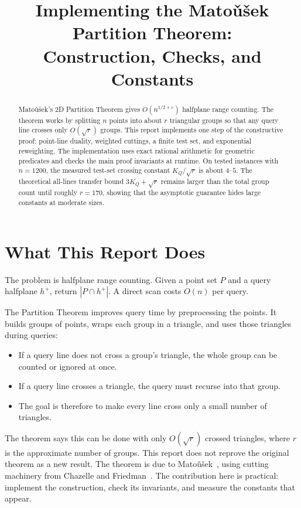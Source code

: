 \documentclass[11pt,a4paper]{article}
\title{Implementing the Mato\v{u}\v{s}ek Partition Theorem:\\
       Construction, Checks, and Constants}
\author{}
\date{}
\begin{document}
\maketitle

\begin{abstract}
Mato\v{u}\v{s}ek's 2D Partition Theorem gives
$O(n^{1/2+\varepsilon})$ halfplane range counting. The theorem works
by splitting $n$ points into about $r$ triangular groups so that any
query line crosses only $O(\sqrt r)$ groups. This report implements
one step of the constructive proof: point-line duality, weighted
cuttings, a finite test set, and exponential reweighting. The
implementation uses exact rational arithmetic for geometric
predicates and checks the main proof invariants at runtime. On tested
instances with $n=1200$, the measured test-set crossing constant
$K_Q/\sqrt r$ is about $4$--$5$. The theoretical all-lines transfer
bound $3K_Q+\sqrt r$ remains larger than the total group count until
roughly $r=170$, showing that the asymptotic guarantee hides large
constants at moderate sizes.
\end{abstract}


\section{What This Report Does}
\label{sec:intro}

The problem is halfplane range counting. Given a point set $P$ and a
query halfplane $h^+$, return $|P\cap h^+|$. A direct scan costs
$O(n)$ per query.

The Partition Theorem improves query time by preprocessing the points.
It builds groups of points, wraps each group in a triangle, and uses
those triangles during queries:
\begin{itemize}[nosep,leftmargin=*]
  \item If a query line does not cross a group's triangle, the whole
        group can be counted or ignored at once.
  \item If a query line crosses a triangle, the query must recurse
        into that group.
  \item The goal is therefore to make every line cross only a small
        number of triangles.
\end{itemize}

The theorem says this can be done with only $O(\sqrt r)$ crossed
triangles, where $r$ is the approximate number of groups. This report
does not reprove the original theorem as a new result. The theorem is
due to Mato\v{u}\v{s}ek~\cite{matousek1992}, using cutting machinery
from Chazelle and Friedman~\cite{chazelle1990}. The contribution here
is practical: implement the construction, check its invariants, and
measure the constants that appear.
\end{document}
